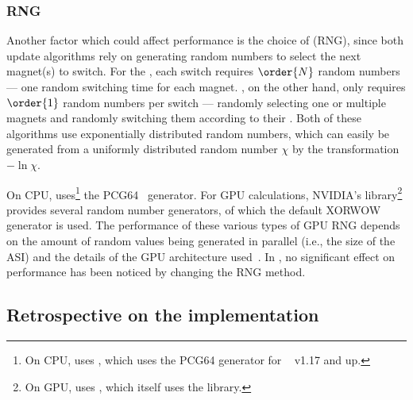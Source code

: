 \subsubsection{RNG}
Another factor which could affect performance is the choice of  (RNG), since both update algorithms rely on generating random numbers to select the next magnet(s) to switch.
For the , each switch requires $\order{N}$ random numbers --- one random switching time for each magnet.
, on the other hand, only requires $\order{1}$ random numbers per switch --- randomly selecting one or multiple magnets and randomly switching them according to their .
Both of these algorithms use exponentially distributed random numbers, which can easily be generated from a uniformly distributed random number $\chi$ by the transformation $-\ln{\chi}$. \par
On CPU, \hotspice uses\footnote{
	On CPU, \hotspice uses , which uses the PCG64 generator for ~\cite{NumPy} v1.17 and up.
} the PCG64~\cite{PCG64} generator.
For GPU calculations, NVIDIA's  library\footnote{
	On GPU, \hotspice uses , which itself uses the  library.
} provides several random number generators, of which the default XORWOW~\cite{XORWOW} generator is used.
The performance of these various types of GPU RNG depends on the amount of random values being generated in parallel (i.e., the size of the ASI) and the details of the GPU architecture used~\cite{RNG_GPU_evaluation}.
In \hotspice, no significant effect on performance has been noticed by changing the RNG method.

\subsection{Retrospective on the \hotspice implementation}
